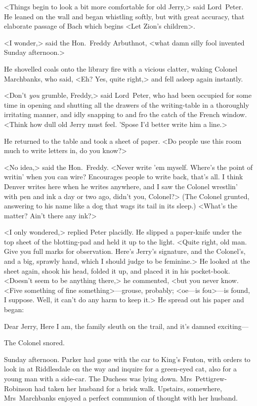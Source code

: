 <Things begin to look a bit more comfortable for old Jerry,> said Lord~Peter. He leaned on the wall and began whistling softly, but with great accuracy, that elaborate passage of Bach which begins <Let Zion's children>.

\divider

<I wonder,> said the Hon.~Freddy Arbuthnot, <what damn silly fool invented Sunday afternoon.>

He shovelled coals onto the library fire with a vicious clatter, waking Colonel Marchbanks, who said, <Eh? Yes, quite right,> and fell asleep again instantly.

<Don't \emph{you} grumble, Freddy,> said Lord~Peter, who had been occupied for some time in opening and shutting all the drawers of the writing-table in a thoroughly irritating manner, and idly snapping to and fro the catch of the French window. <Think how dull old Jerry must feel. 'Spose I'd better write him a line.>

He returned to the table and took a sheet of paper. <Do people use this room much to write letters in, do you know?>

<No idea,> said the Hon.~Freddy. <Never write 'em myself. Where's the point of writin' when you can wire? Encourages people to write back, that's all. I think Denver writes here when he writes anywhere, and I saw the Colonel wrestlin' with pen and ink a day or two ago, didn't you, Colonel?> (The Colonel grunted, answering to his name like a dog that wags its tail in its sleep.) <What's the matter? Ain't there any ink?>

<I only wondered,> replied Peter placidly. He slipped a paper-knife under the top sheet of the blotting-pad and held it up to the light.  <Quite right, old man. Give you full marks for observation. Here's Jerry's signature, and the Colonel's, and a big, sprawly hand, which I should judge to be feminine.> He looked at the sheet again, shook his head, folded it up, and placed it in his pocket-book. <Doesn't seem to be anything there,> he commented, <but you never know. <Five something of fine something>—grouse, probably; <oe—is fou>—is found, I suppose. Well, it can't do any harm to keep it.> He spread out his paper and began:

\begin{mail}{}{Dear Jerry,}
	Here I am, the family sleuth on the trail, and it's damned exciting—
\end{mail}

The Colonel snored.

Sunday afternoon. Parker had gone with the car to King's Fenton, with orders to look in at Riddlesdale on the way and inquire for a green-eyed cat, also for a young man with a side-car. The Duchess was lying down. Mrs~Pettigrew-Robinson had taken her husband for a brisk walk. Upstairs, somewhere, Mrs~Marchbanks enjoyed a perfect communion of thought with her husband.

